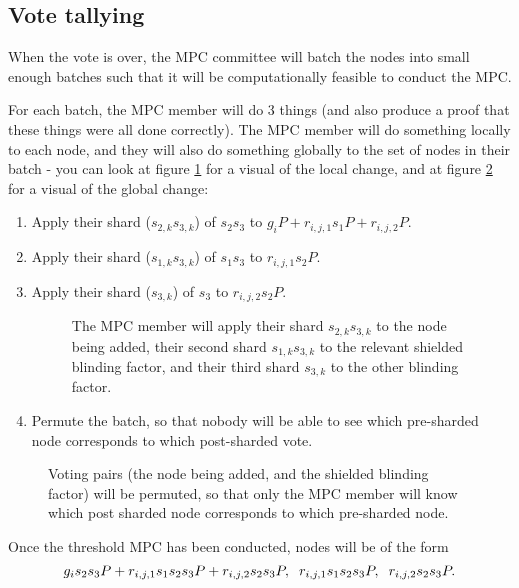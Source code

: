 \documentclass{article}
\begin{document}
\subsection{Vote tallying}
When the vote is over, the MPC committee will batch the nodes into small enough batches such that it will be computationally feasible to conduct the MPC.

For each batch, the MPC member will do 3 things (and also produce a proof that these things were all done correctly). The MPC member will do something locally to each node, and they will also do something globally to the set of nodes in their batch - you can look at figure \ref{fig:figure3} for a visual of the local change, and at figure \ref{fig:figure4} for a visual of the global change:
\begin{enumerate}
    \item Apply their shard ($s_{2,k}s_{3,k}$) of $s_2s_3$ to $g_iP+r_{i,j,1}s_1P + r_{i,j,2}P$.
    \item Apply their shard ($s_{1,k}s_{3,k}$) of $s_1s_3$ to $r_{i,j,1}s_2P$.
    \item Apply their shard ($s_{3,k}$) of $s_3$ to $r_{i,j,2}s_2P$.
    \begin{figure}[h!]
        \centering
        
        \caption{The MPC member will apply their shard $s_{2,k}s_{3,k}$ to the node being added, their second shard $s_{1,k}s_{3,k}$ to the relevant shielded blinding factor, and their third shard $s_{3,k}$ to the other blinding factor.}
        \label{fig:figure3}
    \end{figure}
    \item Permute the batch, so that nobody will be able to see which pre-sharded node corresponds to which post-sharded vote.
\end{enumerate}


\begin{figure}[h!]
        \centering
        
        \caption{Voting pairs (the node being added, and the shielded blinding factor) will be permuted, so that only the MPC member will know which post sharded node corresponds to which pre-sharded node.}
        \label{fig:figure4}
\end{figure}

Once the threshold MPC has been conducted, nodes will be of the form
$$ g_is_2s_3P + r_{i,j,1}s_1s_2s_3P + r_{i,j,2}s_2s_3P, \hspace{2mm}r_{i,j,1}s_1s_2s_3P, \hspace{2mm} r_{i,j,2}s_2s_3P. $$
\end{document}

